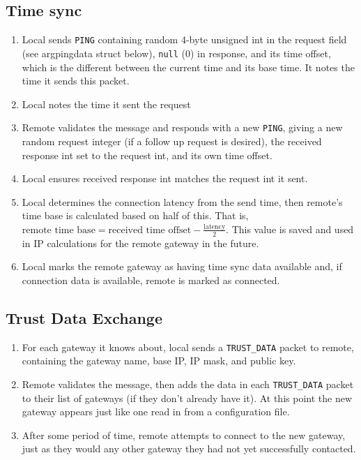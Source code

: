 \subsection{Time sync}
\begin{enumerate}
	\item Local sends \texttt{PING} containing random 4-byte unsigned int in the request field (see argpingdata struct below), \texttt{null} (0) in response, and its time offset, which is the different between the current time and its base time. It notes the time it sends this packet. 
	\item Local notes the time it sent the request
	\item Remote validates the message and responds with a new \texttt{PING}, giving a new random request integer (if a follow up request is desired), the received response int set to the request int, and its own time offset.
	\item Local ensures received response int matches the request int it sent.
	\item Local determines the connection latency from the send time, then remote's time base is calculated based on half of this. That is, $\text{remote time base} = \text{received time offset} - \frac{\text{latency}}{2}$. This value is saved and used in \ac{IP} calculations for the remote gateway in the future.
	\item Local marks the remote gateway as having time sync data available and, if connection data is available, remote is marked as connected. 
\end{enumerate}

\subsection{Trust Data Exchange}
\begin{enumerate}
	\item For each gateway it knows about, local sends a \texttt{TRUST\_DATA} packet to remote, containing the gateway name, base \ac{IP}, \ac{IP} mask, and public key.
	\item Remote validates the message, then adds the data in each \texttt{TRUST\_DATA} packet to their list of gateways (if they don't already have it). At this point the new gateway appears just like one read in from a configuration file.
	\item After some period of time, remote attempts to connect to the new gateway, just as they would any other gateway they had not yet successfully contacted.
 \end{enumerate}

